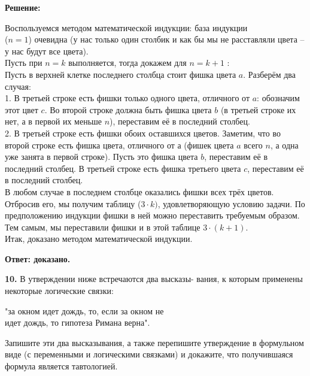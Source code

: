 \documentclass[a4paper,12pt]{article} %
\begin{document}
\begin{center}
\bfseries
{\Large Решение: }
\end{center}
Воспользуемся методом математической индукции: база индукции \\($n = 1$) очевидна (у нас только один столбик и как бы мы не расставляли цвета -- у нас будут все цвета).\\
Пусть при $ n = k$ выполняется, тогда докажем для $ n = k+1$ :\\
Пусть в верхней клетке последнего столбца стоит фишка цвета $a$. Разберём два случая:\\
1. В третьей строке есть фишки только одного цвета, отличного от $a$: обозначим этот цвет $c$. Во второй строке должна быть фишка цвета $b$ (в третьей строке их нет, $а$ в первой их меньше $n$), переставим её в последний столбец.\\
2. В третьей строке есть фишки обоих оставшихся цветов. Заметим, что во второй строке есть фишка цвета, отличного от $а$ (фишек цвета $a$ всего $n$, а одна уже занята в первой строке). Пусть это фишка цвета $b$, переставим её в последний столбец. В третьей строке есть фишка третьего цвета $c$, переставим её в последний столбец.\\
  В любом случае в последнем столбце оказались фишки всех трёх цветов. Отбросив его, мы получим таблицу  ($3\cdot k)$,  удовлетворяющую условию задачи. По предположению индукции фишки в ней можно переставить требуемым образом. Тем самым, мы переставили фишки и в этой таблице $3 \cdot (k+1)$.\\
Итак, доказано методом математической индукции.




\begin{flushright}
\begin{large}
\textbf {Ответ: доказано.}
\end{large}
\end{flushright}

\newpage

{\bf 10. }В утверждении ниже встречаются два высказы-
вания, к которым применены некоторые логические связки:
\begin{center}
"за окном идет дождь, то, если за окном не\\
идет дождь, то гипотеза Римана верна".
\end{center} 

Запишите эти два высказывания, а также перепишите утверждение в формульном виде (с переменными и логическими связками) и докажите, что получившаяся формула является тавтологией.
\end{document}
